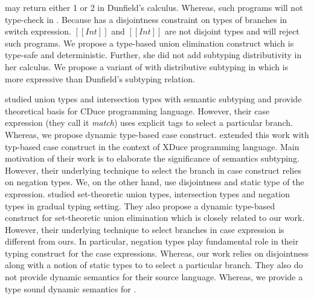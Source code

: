 \noindent may return either 1 or 2 in Dunfield's calculus.
Whereas, such programs will not
type-check in \cal. Because \cal has a disjointness constraint on
types of branches in switch expression.
$[[Int]]$ and $[[Int]]$ are not disjoint types and \cal 
will reject such programs.
We propose a type-based union elimination construct which is
type-safe and deterministic.
Further, she did not add subtyping distributivity in her calculus.
We propose a variant of \cal with distributive subtyping in 
which is more expressive than Dunfield's subtyping relation.

\cite{frisch2002semantic} studied union types and intersection types
with semantic subtyping and provide theoretical basis for CDuce programming language.
However, their case expression (they call it \emph{match}) uses explicit
tags to select a particular branch. Whereas, we propose dynamic type-based
case construct.
\cite{castagna2005gentle} extended this work with typ-based case construct
in the context of XDuce programming language. Main motivation of their
work is to elaborate the significance of semantics subtyping.
However, their underlying technique to select the branch in case construct
relies on negation types. We, on the other hand, use disjointness
and static type of the expression. 
\citet{castagna2017gradual} studied
set-theoretic union types, intersection types and negation types
in gradual typing setting. They also propose a dynamic type-based
construct for set-theoretic union elimination which is closely
related to our work.
However, their underlying technique to select branches in case
expression is different from ours.
In particular, negation types play fundamental role in their
typing construct for the case expressions.
Whereas, our work relies on disjointness along with a notion of 
static types to to select a particular branch.
They also do not provide dynamic semantics for their source language.
Whereas, we provide a type sound dynamic semantics for \cal.

